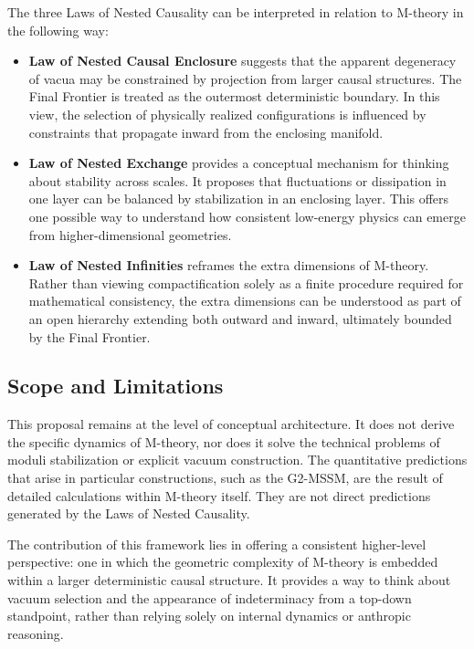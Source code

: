 The three Laws of Nested Causality can be interpreted in relation to M-theory in the following way:

\begin{itemize}
    \item \textbf{Law of Nested Causal Enclosure} suggests that the apparent degeneracy of vacua may be constrained by projection from larger causal structures. The Final Frontier is treated as the outermost deterministic boundary. In this view, the selection of physically realized configurations is influenced by constraints that propagate inward from the enclosing manifold.

    \item \textbf{Law of Nested Exchange} provides a conceptual mechanism for thinking about stability across scales. It proposes that fluctuations or dissipation in one layer can be balanced by stabilization in an enclosing layer. This offers one possible way to understand how consistent low-energy physics can emerge from higher-dimensional geometries.

    \item \textbf{Law of Nested Infinities} reframes the extra dimensions of M-theory. Rather than viewing compactification solely as a finite procedure required for mathematical consistency, the extra dimensions can be understood as part of an open hierarchy extending both outward and inward, ultimately bounded by the Final Frontier.
\end{itemize}

\subsection{Scope and Limitations}

This proposal remains at the level of conceptual architecture. It does not derive the specific dynamics of M-theory, nor does it solve the technical problems of moduli stabilization or explicit vacuum construction. The quantitative predictions that arise in particular constructions, such as the G2-MSSM, are the result of detailed calculations within M-theory itself. They are not direct predictions generated by the Laws of Nested Causality.

The contribution of this framework lies in offering a consistent higher-level perspective: one in which the geometric complexity of M-theory is embedded within a larger deterministic causal structure. It provides a way to think about vacuum selection and the appearance of indeterminacy from a top-down standpoint, rather than relying solely on internal dynamics or anthropic reasoning.

